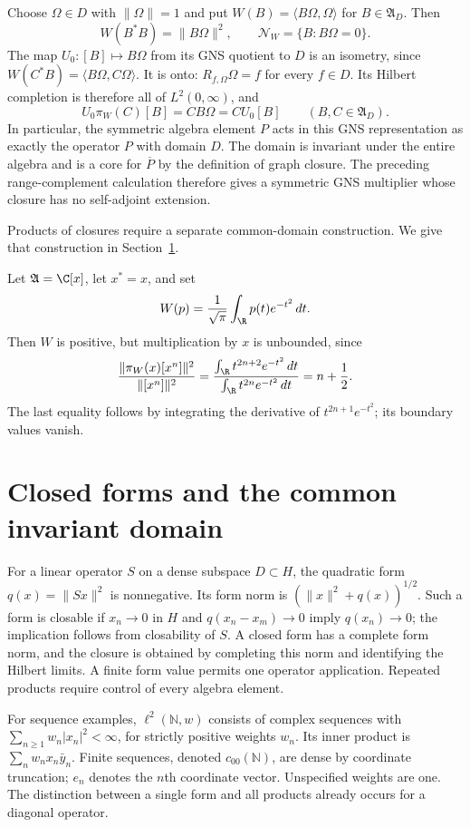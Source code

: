 Choose $\Omega\in D$ with $\|\Omega\|=1$ and put
$W(B)=\langle B\Omega,\Omega\rangle$ for $B\in\mathfrak A_D$.
Then
\[
 W(B^*B)=\|B\Omega\|^2,\qquad
 \mathcal N_W=\{B:B\Omega=0\}.
\]
The map $U_0:[B]\mapsto B\Omega$ from its GNS quotient to $D$ is an
isometry, since
$W(C^*B)=\langle B\Omega,C\Omega\rangle$.
It is onto: $R_{f,\Omega}\Omega=f$ for every $f\in D$.
Its Hilbert completion is therefore all of $L^2(0,\infty)$, and
\[
 U_0\pi_W(C)[B]=CB\Omega=C U_0[B]
 \qquad(B,C\in\mathfrak A_D).
\]
In particular, the symmetric algebra element $P$ acts in this GNS
representation as exactly the operator $P$ with domain $D$.
The domain is invariant under the entire algebra and is a core for
$\overline P$ by the definition of graph closure.  The preceding
range-complement calculation therefore gives a symmetric GNS multiplier
whose closure has no self-adjoint extension.

Products of closures require a separate common-domain construction.
We give that construction in Section~\ref{sec:graph-domain}.

\begin{example}
Let $\mathfrak A=\C[x]$, let $x^*=x$, and set
\[
 W(p)=\frac1{\sqrt\pi}\int_{\R}p(t)e^{-t^2}\,dt.
\]
Then $W$ is positive, but multiplication by $x$ is unbounded, since
\[
 \frac{\|\pi_W(x)[x^n]\|^2}{\|[x^n]\|^2}
 =\frac{\int_{\R}t^{2n+2}e^{-t^2}\,dt}
        {\int_{\R}t^{2n}e^{-t^2}\,dt}
 =n+\frac12.
\]
The last equality follows by integrating the derivative of
$t^{2n+1}e^{-t^2}$; its boundary values vanish.
\end{example}

\section{Closed forms and the common invariant domain}
\label{sec:graph-domain}

For a linear operator $S$ on a dense subspace $D\subset H$, the quadratic
form $q(x)=\|Sx\|^2$ is nonnegative.  Its form norm is
$(\|x\|^2+q(x))^{1/2}$.  Such a form is closable if $x_n\to0$ in $H$ and
$q(x_n-x_m)\to0$ imply $q(x_n)\to0$; the implication follows from
closability of $S$.  A closed form has a complete form norm, and the closure
is obtained by completing this norm and identifying the Hilbert limits.
A finite form value permits one operator application.  Repeated products
require control of every algebra element.

For sequence examples, $\ell^2(\mathbb N,w)$ consists of complex sequences
with $\sum_{n\geq1}w_n|x_n|^2<\infty$, for strictly positive weights $w_n$.
Its inner product is $\sum_n w_nx_n\bar y_n$.  Finite sequences, denoted
$c_{00}(\mathbb N)$, are dense by coordinate truncation; $e_n$ denotes the
$n$th coordinate vector.  Unspecified weights are one.
The distinction between a single form and all products already occurs for
a diagonal operator.

